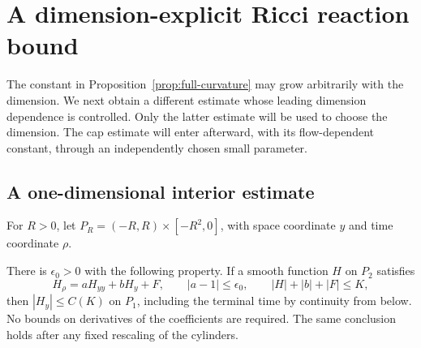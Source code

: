 \section{A dimension-explicit Ricci reaction bound}\label{sec:reaction}

The constant in Proposition~\ref{prop:full-curvature} may grow arbitrarily
with the dimension. We next obtain a different estimate whose leading
dimension dependence is controlled.
Only the latter estimate will be used to choose the dimension. The
cap estimate will enter afterward, with its flow-dependent constant,
through an independently chosen small parameter.

\subsection{A one-dimensional interior estimate}

For \(R>0\), let \(P_R=(-R,R)\times[-R^2,0]\), with space coordinate
\(y\) and time coordinate \(\rho\).

\begin{lemma}\label{lem:heat-perturbation}
There is \(\epsilon_0>0\) with the following property. If a smooth
function \(H\) on \(P_2\) satisfies
\[
H_\rho=aH_{yy}+bH_y+F,\qquad
|a-1|\le\epsilon_0,\qquad |H|+|b|+|F|\le K,
\]
then \(|H_y|\le C(K)\) on \(P_1\), including the terminal time by
continuity from below. No bounds on derivatives of the coefficients are
required. The same conclusion holds after any fixed rescaling of the
cylinders.
\end{lemma}

